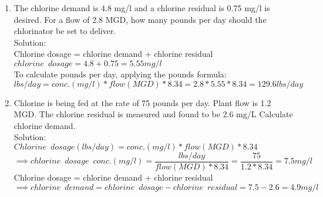 \documentclass{article}
\begin{document}
\begin{enumerate}


\item The chlorine demand is 4.8 mg/l and a chlorine residual is 0.75 mg/l is desired. For a flow of 2.8 MGD, how many pounds per day should the chlorinator be set to deliver.\\
Solution:\\
Chlorine dosage = chlorine demand + chlorine residual\\
$chlorine \enspace dosage=4.8+0.75=5.55mg/l$\\
To calculate pounds per day, applying the pounds formula:\\  
$lbs/day=conc. (mg/l)*flow(MGD)*8.34=2.8*5.55*8.34=\boxed{129.6lbs/day}$\\

\item Chlorine is being fed at the rate of 75 pounds per day. Plant flow is 1.2 MGD. The chlorine residual is measured and found to be 2.6 mg/L Calculate chlorine demand.\\
Solution:\\
$Chlorine \enspace dosage (lbs/day)=conc. (mg/l)*flow(MGD)*8.34$\\
$\implies chlorine \enspace dosage \enspace conc. (mg/l)=\dfrac{lbs/day}{flow(MGD)*8.34}=\dfrac{75}{1.2*8.34}=7.5mg/l$\\
Chlorine dosage = chlorine demand + chlorine residual\\
$ \implies chlorine \enspace demand = chlorine \enspace dosage - chlorine \enspace residual=7.5-2.6=\boxed{4.9mg/l}$

\end{enumerate}
\end{document}
